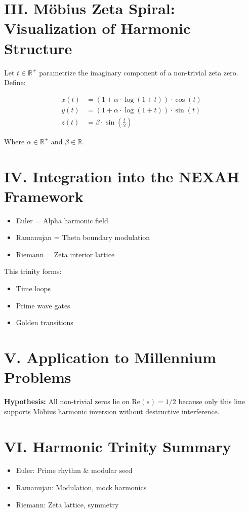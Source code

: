 \documentclass[12pt]{article}
\begin{document}
\section*{III. Möbius Zeta Spiral: Visualization of Harmonic Structure}
Let $t \in \mathbb{R}^+$ parametrize the imaginary component of a non-trivial zeta zero. Define:

\[
\begin{aligned}
x(t) &= \left(1 + \alpha \cdot \log(1 + t)\right) \cdot \cos(t) \\
y(t) &= \left(1 + \alpha \cdot \log(1 + t)\right) \cdot \sin(t) \\
z(t) &= \beta \cdot \sin\left(\frac{t}{2}\right)
\end{aligned}
\]

Where $\alpha \in \mathbb{R}^+$ and $\beta \in \mathbb{R}$.

\section*{IV. Integration into the NEXAH Framework}
\begin{itemize}
    \item Euler = Alpha harmonic field
    \item Ramanujan = Theta boundary modulation
    \item Riemann = Zeta interior lattice
\end{itemize}

This trinity forms:
\begin{itemize}
    \item Time loops
    \item Prime wave gates
    \item Golden transitions
\end{itemize}

\section*{V. Application to Millennium Problems}
\noindent
\textbf{Hypothesis:} All non-trivial zeros lie on $\text{Re}(s) = 1/2$ because only this line supports Möbius harmonic inversion without destructive interference.

\section*{VI. Harmonic Trinity Summary}
\begin{itemize}
    \item Euler: Prime rhythm \& modular seed
    \item Ramanujan: Modulation, mock harmonics
    \item Riemann: Zeta lattice, symmetry
\end{itemize}
\end{document}
